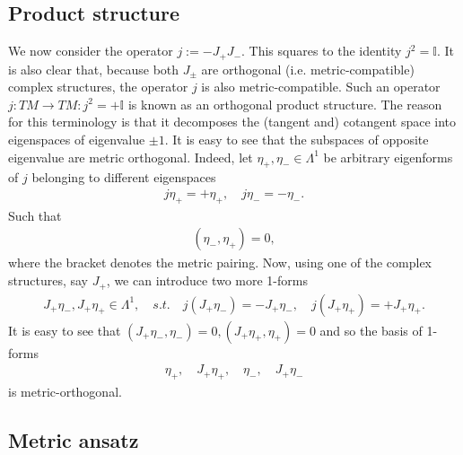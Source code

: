 \documentclass[10pt]{report}
\theoremstyle{definition}
\newcommand{\id}{\mathbb{I}}
\begin{document}
\subsection{Product structure}
We now consider the operator $j:= -J_+ J_-$. This squares to the identity $j^2 = \id$. It is also clear that, because both $J_\pm$ are orthogonal (i.e. metric-compatible) complex structures, the operator $j$ is also metric-compatible. Such an operator $j:TM\to TM: j^2 = +\id$ is known as an orthogonal product structure. The reason for this terminology is that it decomposes the (tangent and) cotangent space into eigenspaces of eigenvalue $\pm 1$. It is easy to see that the subspaces of opposite eigenvalue are metric orthogonal. Indeed, let $\eta_+, \eta_-\in \Lambda^1$ be arbitrary eigenforms of $j$ belonging to different eigenspaces 
    \begin{align}
        j \eta_+ = +\eta_+, \quad j \eta_- = - \eta_-.
    \end{align}
    Such that
    \begin{align}
        (\eta_-,\eta_+) = 0,
    \end{align}
    where the bracket denotes the metric pairing. Now, using one of the complex structures, say $J_+$, we can introduce two more 1-forms
    \begin{align}
        J_+ \eta_-, J_+ \eta_+ \in \Lambda^1, \quad s.t. \quad j(J_+ \eta_-) = - J_+ \eta_-, \quad j(J_+ \eta_+) = +J_+ \eta_+.
    \end{align}
    It is easy to see that $(J_+ \eta_-,\eta_-)=0, (J_+ \eta_+,\eta_+)=0$ and so the basis of 1-forms 
        \begin{align}
        \eta_+,\quad J_+ \eta_+,\quad \eta_-,\quad J_+ \eta_-
    \end{align}
   is metric-orthogonal. 

\subsection{Metric ansatz}
\end{document}

